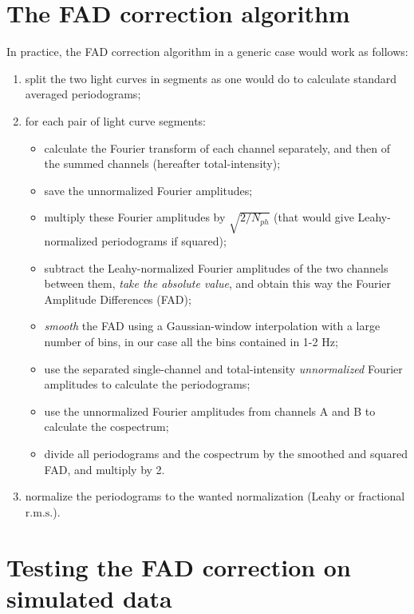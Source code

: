 \documentclass[twocolumn]{aastex61}
\newcommand{\rms}{\ensuremath{\mathrm{r.m.s.}}\xspace}
\begin{document}
\section{The FAD correction algorithm} \label{sec:fad}
In practice, the FAD correction algorithm in a generic case would work as follows:
\begin{enumerate}
\item split the two light curves in segments as one would do to calculate standard averaged periodograms;
\item for each pair of light curve segments: 
	\begin{itemize}
	\item calculate the Fourier transform of each channel separately, and then of the summed channels (hereafter total-intensity);
	\item save the unnormalized Fourier amplitudes;
	\item multiply these Fourier amplitudes by $\sqrt{2/N_{ph}}$ (that would give Leahy-normalized periodograms if squared);
	\item subtract the Leahy-normalized Fourier amplitudes of the two channels between them, \textit{take the absolute value}, and obtain this way the Fourier Amplitude Differences (FAD);
	\item \textit{smooth} the FAD using a Gaussian-window interpolation with a large number of bins, in our case all the bins contained in 1-2 Hz;
	\item use the separated single-channel and total-intensity \textit{unnormalized} Fourier amplitudes to calculate the periodograms;
	\item use the unnormalized Fourier amplitudes from channels A and B to calculate the cospectrum;
	\item divide all periodograms and the cospectrum by the smoothed and squared FAD, and multiply by 2.
	\end{itemize}
\item normalize the periodograms to the wanted normalization (Leahy or fractional \rms).
\end{enumerate}

\section{Testing the FAD correction on simulated data} \label{sec:correction}
\end{document}
